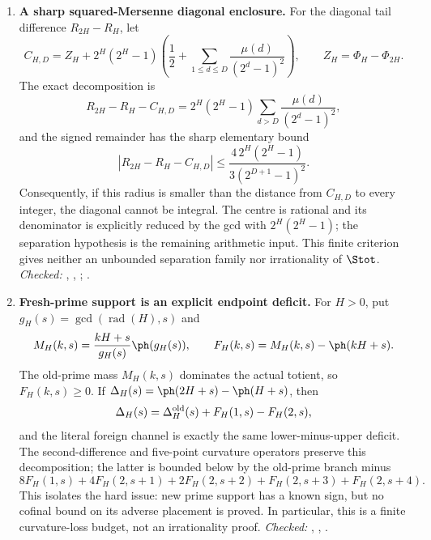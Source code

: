 {\begin{enumerate}[label=\textbf{R\arabic*.},ref=R\arabic*,leftmargin=2.4em,
  itemsep=0.2em,topsep=0.25em]
\item\label{res:squareenclosure} 
\textbf{A sharp squared-Mersenne diagonal enclosure.}  For the diagonal
tail difference \(R_{2H}-R_H\), let
\[
 C_{H,D}=Z_H+2^H(2^H-1)\left(\frac12+
   \sum_{1\le d\le D}\frac{\mu(d)}{(2^d-1)^2}\right),
 \qquad Z_H=\Phi_H-\Phi_{2H}.
\]
The exact decomposition is
\[
 R_{2H}-R_H-C_{H,D}
 =2^H(2^H-1)\sum_{d>D}\frac{\mu(d)}{(2^d-1)^2},
\]
and the signed remainder has the sharp elementary bound
\[
 \left|R_{2H}-R_H-C_{H,D}\right|
 \le \frac{4\,2^H(2^H-1)}{3(2^{D+1}-1)^2}.
\]
Consequently, if this radius is smaller than the distance from \(C_{H,D}\)
to every integer, the diagonal cannot be integral.  The centre is rational
and its denominator is explicitly reduced by the gcd with \(2^H(2^H-1)\);
the separation hypothesis is the remaining arithmetic input.  This finite
criterion gives neither an unbounded separation family nor irrationality of
\(\Stot\).
{\footnotesize\emph{Checked:}
,
,
;
.}

\item\label{res:freshprimedeficit} 
\textbf{Fresh-prime support is an explicit endpoint deficit.}  For \(H>0\),
put \(g_H(s)=\gcd(\operatorname{rad}(H),s)\) and
\[
 M_H(k,s)=\frac{kH+s}{g_H(s)}\ph(g_H(s)),
 \qquad F_H(k,s)=M_H(k,s)-\ph(kH+s).
\]
The old-prime mass \(M_H(k,s)\) dominates the actual totient, so
\(F_H(k,s)\ge0\).  If \(\Delta_H(s)=\ph(2H+s)-\ph(H+s)\), then
\[
 \Delta_H(s)=\Delta_H^{\rm old}(s)+F_H(1,s)-F_H(2,s),
\]
and the literal foreign channel is exactly the same lower-minus-upper
deficit.  The second-difference and five-point curvature operators preserve
this decomposition; the latter is bounded below by the old-prime branch
minus
\[
 8F_H(1,s)+4F_H(2,s+1)+2F_H(2,s+2)+F_H(2,s+3)+F_H(2,s+4).
\]
This isolates the hard issue: new prime support has a known sign, but no
cofinal bound on its adverse placement is proved.  In particular, this is a
finite curvature-loss budget, not an irrationality proof.
{\footnotesize\emph{Checked:}
,
,
.}


\end{enumerate}}
